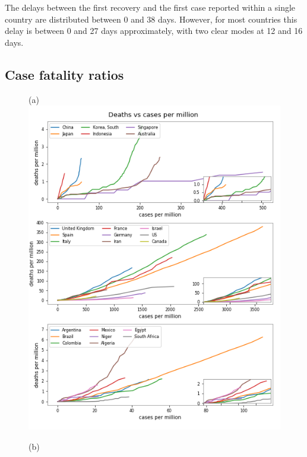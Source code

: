 \documentclass[8pt]{article}
\begin{document}
The delays between the first recovery and the first case reported within a single country are distributed between 0 and 38 days. However, for most countries this delay is between 0 and 27 days approximately, with two clear modes at 12 and 16 days.  

\subsection{Case fatality ratios}

\begin{figure}[h]
    \centering
    \begin{minipage}{0.5\textwidth}
    (a)\\
    \includegraphics[width=\textwidth]{figures/tsam_COVID19_JHU_cases-deaths_x1000000_JHU.png}
    \end{minipage}%
    \begin{minipage}{0.5\textwidth}
    (b)\\

\end{minipage}
\end{figure}
\end{document}
